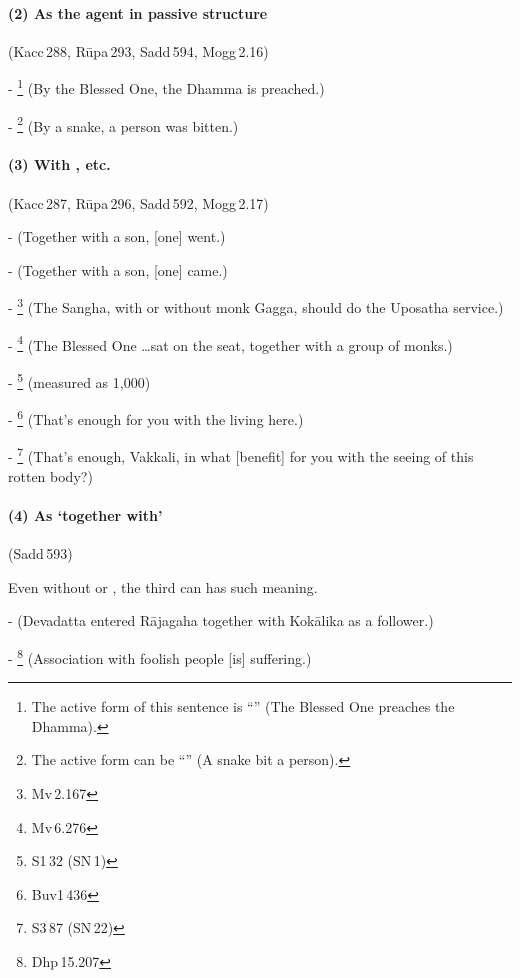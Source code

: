 \paragraph*{(2) As the agent in passive structure} (Kacc\,288, R\=upa\,293, Sadd\,594, Mogg\,2.16)\par
- \footnote{The active form of this sentence is ``'' (The Blessed One preaches the Dhamma).} (By the Blessed One, the Dhamma is preached.)\par
- \footnote{The active form can be ``'' (A snake bit a person).} (By a snake, a person was bitten.)\par

\paragraph*{(3) With , etc.} (Kacc\,287, R\=upa\,296, Sadd\,592, Mogg\,2.17)\par
-  (Together with a son, [one] went.)\par
-  (Together with a son, [one] came.)\par
- \footnote{Mv\,2.167} (The Sangha, with or without monk Gagga, should do the Uposatha service.)\par
- \footnote{Mv\,6.276} (The Blessed One \ldots sat on the seat, together with a group of monks.)\par
- \footnote{S1\,32 (SN\,1)} (measured as 1,000)\par
- \footnote{Buv1\,436} (That's enough for you with the living here.)\par
- \footnote{S3\,87 (SN\,22)} (That's enough, Vakkali, in what [benefit] for you with the seeing of this rotten body?)\par

\paragraph*{(4) As `together with'} (Sadd\,593)\par
Even without  or , the third  can has such meaning.\par
-  (Devadatta entered R\=ajagaha together with Kok\=alika as a follower.)\par
- \footnote{Dhp\,15.207} (Association with foolish people [is] suffering.)\par

